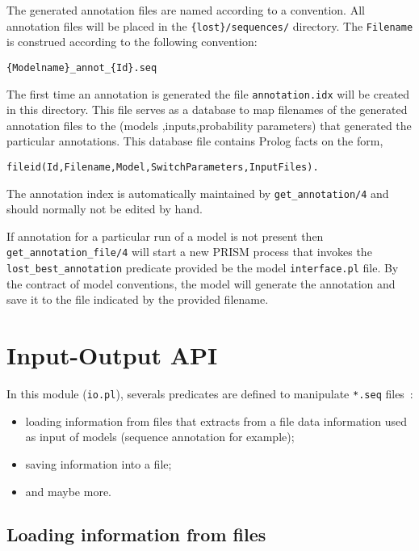 \documentclass{book}
\begin{document}
The generated annotation files are named according to a convention. 
All annotation files will be placed in the \texttt{\{lost\}/sequences/}
directory. 
The \texttt{Filename} is construed according to the following convention:
\begin{verbatim}
{Modelname}_annot_{Id}.seq
\end{verbatim}

The first time an annotation is generated the file
\texttt{annotation.idx} will be created in this directory. This file
serves as a database to map filenames of the generated annotation
files to the (models ,inputs,probability parameters) that generated
the particular annotations. This database file contains Prolog facts 
on the form,
\begin{verbatim}
fileid(Id,Filename,Model,SwitchParameters,InputFiles).
\end{verbatim}

The annotation index is automatically maintained by
\texttt{get\_annotation/4} and should normally not be edited by hand.

If annotation for a particular run of a model is not present then
\texttt{get\_annotation\_file/4} will start a new PRISM process 
that invokes the \texttt{lost\_best\_annotation} predicate provided
be the model \texttt{interface.pl} file. By the contract of model 
conventions, the model will generate the annotation and save it 
to the file indicated by the provided filename.

\section{Input-Output API}
\label{sec:io}

In this module (\texttt{io.pl}), severals predicates are defined to
manipulate \texttt{*.seq} files~:
\begin{itemize}
\item loading information from files that extracts from a file data information used as input of models (sequence annotation for example);
\item saving information into a file;
\item and maybe more. 
\end{itemize}

\subsection{Loading information from files}
\end{document}
